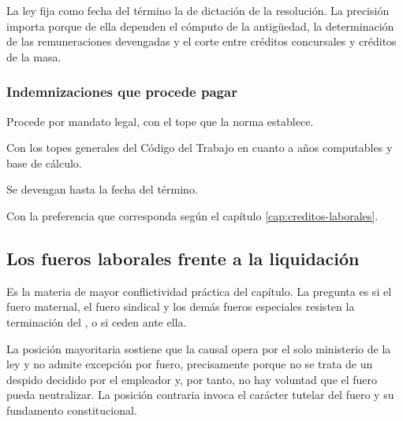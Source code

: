 La ley fija como fecha del término la de dictación de la resolución. La precisión importa
porque de ella dependen el cómputo de la antigüedad, la determinación de las
remuneraciones devengadas y el corte entre créditos concursales y créditos de la
masa.

\subsubsection{Indemnizaciones que procede pagar}

\begin{description}[leftmargin=0pt,style=nextline,font=\sffamily\bfseries]
  \item[Indemnización sustitutiva del aviso previo] Procede por mandato legal, con el tope
  que la norma establece.

  \item[Indemnización por años de servicio] Con los topes generales del Código del
  Trabajo en cuanto a años computables y base de cálculo.

  \item[Feriado proporcional y feriado pendiente] Se devengan hasta la fecha del término.

  \item[Remuneraciones y cotizaciones adeudadas] Con la preferencia que corresponda según
  el capítulo \ref{cap:creditos-laborales}.
\end{description}

\subsection{Los fueros laborales frente a la liquidación}

Es la materia de mayor conflictividad práctica del capítulo. La pregunta es si el fuero
maternal, el fuero sindical y los demás fueros especiales resisten la terminación del
, o si ceden ante ella.

La posición mayoritaria sostiene que la causal opera por el solo ministerio de la ley y
no admite excepción por fuero, precisamente porque no se trata de un despido decidido por
el empleador y, por tanto, no hay voluntad que el fuero pueda neutralizar. La posición
contraria invoca el carácter tutelar del fuero y su fundamento constitucional.

